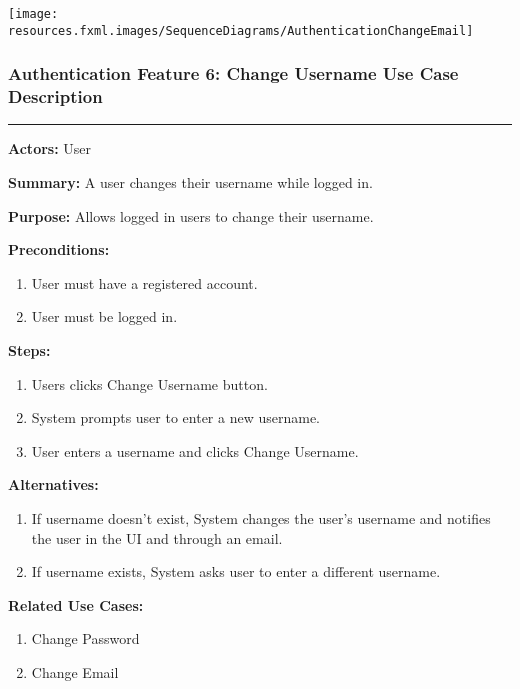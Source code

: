 \documentclass[twoside,letterpaper]{article}
\begin{document}
\texttt{[image: resources.fxml.images/SequenceDiagrams/AuthenticationChangeEmail]}

\newpage

\subsubsection[Authentication Feature 6: Change Username Use Case Description] {\rmfamily\bfseries\color{black}
	Authentication Feature 6: Change Username Use Case Description}
	\label{a:uc6}
\hypertarget{RefHeading22059017292}{}

\hrule
\vspace{8pt}
\noindent\textbf{Actors:} User \newline

\noindent\textbf{Summary:} A user changes their username while logged in.  \newline

\noindent\textbf{Purpose:} Allows logged in users to change their username.  \newline

\noindent\textbf{Preconditions:}
\begin{enumerate}
	\item User must have a registered account.
	\item User must be logged in.
\end{enumerate}

\noindent\textbf{Steps:}
\begin{enumerate}
	\item Users clicks Change Username button.
	\item System prompts user to enter a new username.
	\item User enters a username and clicks Change Username.
\end{enumerate}

\noindent\textbf{Alternatives:}
\begin{enumerate}
	\item If username doesn't exist, System changes the user's username and notifies the user in the UI and through an email.
	\item If username exists, System asks user to enter a different username.
\end{enumerate}

\noindent\textbf{Related Use Cases:}
\begin{enumerate}
	\item Change Password
	\item Change Email
\end{enumerate}
\end{document}
